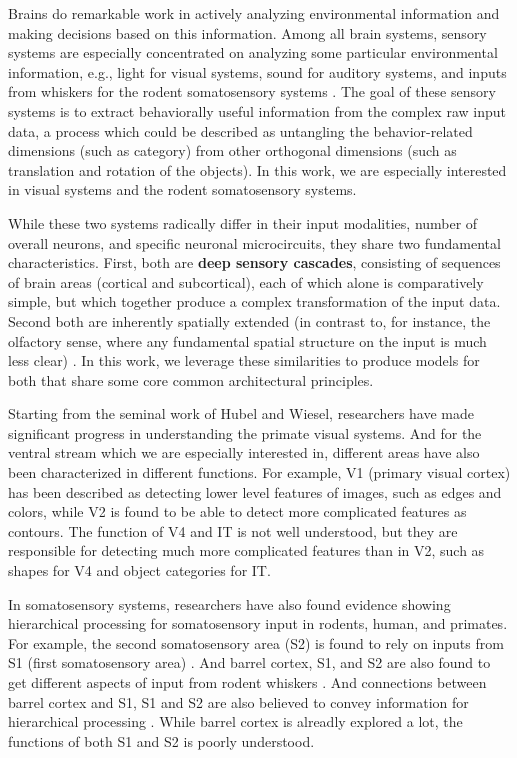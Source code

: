 \documentclass[12pt]{article}
\begin{document}
Brains do remarkable work in actively analyzing environmental information and making decisions based on this information. Among all brain systems, sensory systems are especially concentrated on analyzing some particular environmental information, e.g., light for visual systems, sound for auditory systems, and inputs from whiskers for the rodent somatosensory systems \cite{purves2001neuroscience}.
The goal of these sensory systems is to extract behaviorally useful information from the complex raw input data, a process which could be described as untangling the behavior-related dimensions (such as category) from other orthogonal dimensions (such as translation and rotation of the objects)\cite{yamins2016using}. In this work, we are especially interested in visual systems and the rodent somatosensory systems.

While these two systems radically differ in their input modalities, number of overall neurons, and specific neuronal microcircuits, they share two fundamental characteristics. First, both are \textbf{deep sensory cascades}, consisting of sequences of brain areas (cortical and subcortical), each of which alone is comparatively simple, but which together produce a complex transformation of the input data. Second both are inherently spatially extended (in contrast to, for instance, the olfactory sense, where any fundamental spatial structure on the input is much less clear) \cite{felleman1991distributed}. In this work, we leverage these similarities to produce models for both that share some core common architectural principles.

Starting from the seminal work of Hubel and Wiesel, researchers have made significant progress in understanding the primate visual systems. And for the ventral stream \cite{Goodale1992} which we are especially interested in, different areas have also been characterized in different functions. For example, V1 (primary visual cortex) has been described as detecting lower level features of images, such as edges and colors, while V2 is found to be able to detect more complicated features as contours. The function of V4 and IT is not well understood, but they are responsible for detecting much more complicated features than in V2, such as shapes for V4 and object categories for IT.

In somatosensory systems, researchers have also found evidence showing hierarchical processing for somatosensory input in rodents, human, and primates\cite{Pons1987, Inui2004, Iwamura1998}. For example, the second somatosensory area (S2) is found to rely on inputs from S1 (first somatosensory area) \cite{Pons1987, Petersen2007}. And barrel cortex, S1, and S2 are also found to get different aspects of input from rodent whiskers \cite{Diamond2008}. And connections between barrel cortex and S1, S1 and S2 are also believed to convey information for hierarchical processing \cite{Petersen2007}. While barrel cortex is alreadly explored a lot, the functions of both S1 and S2 is poorly understood.
\end{document}

